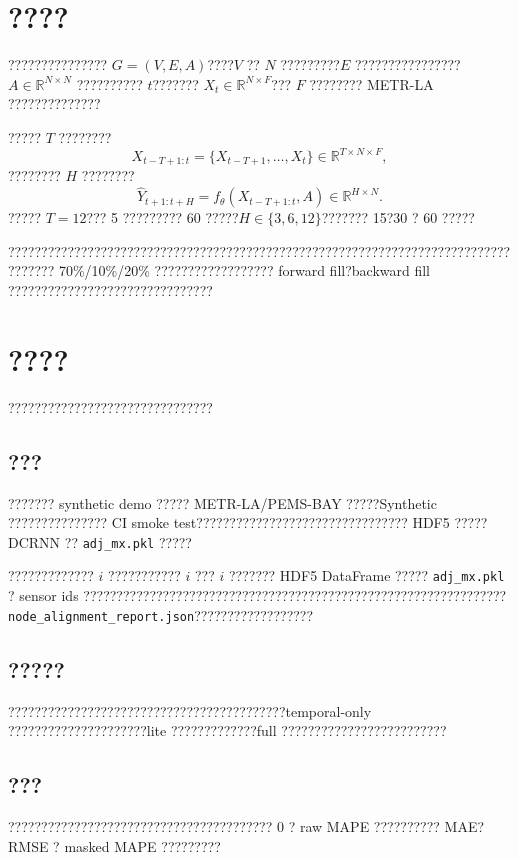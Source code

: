\documentclass[11pt]{ctexart}
\begin{document}
\section{????}
??????????????? $G=(V,E,A)$????$V$ ?? $N$ ?????????$E$ ????????????????$A\in\mathbb{R}^{N\times N}$ ?????????? $t$??????? $X_t\in\mathbb{R}^{N\times F}$??? $F$ ???????? METR-LA ??????????????

????? $T$ ????????
\begin{equation}
  X_{t-T+1:t}=\{X_{t-T+1},\ldots,X_t\}\in\mathbb{R}^{T\times N\times F},
\end{equation}
???????? $H$ ????????
\begin{equation}
  \hat{Y}_{t+1:t+H}=f_\theta(X_{t-T+1:t}, A)\in\mathbb{R}^{H\times N}.
\end{equation}
????? $T=12$??? 5 ????????? 60 ?????$H\in\{3,6,12\}$??????? 15?30 ? 60 ?????

??????????????????????????????????????????????????????????????????????????????????? 70\%/10\%/20\% ?????????????????? forward fill?backward fill ???????????????????????????????

\section{????}
???????????????????????????????

\subsection{???}
??????? synthetic demo ????? METR-LA/PEMS-BAY ?????Synthetic ??????????????? CI smoke test???????????????????????????????? HDF5 ????? DCRNN ?? \texttt{adj\_mx.pkl} ?????

????????????? $i$ ??????????? $i$ ??? $i$ ??????? HDF5 DataFrame ????? \texttt{adj\_mx.pkl} ? sensor ids ???????????????????????????????????????????????????????????????? \texttt{node\_alignment\_report.json}??????????????????

\subsection{?????}
??????????????????????????????????????????temporal-only ?????????????????????lite ?????????????full ?????????????????????????

\subsection{???}
???????????????????????????????????????? 0 ? raw MAPE ?????????? MAE?RMSE ? masked MAPE ?????????
\end{document}

